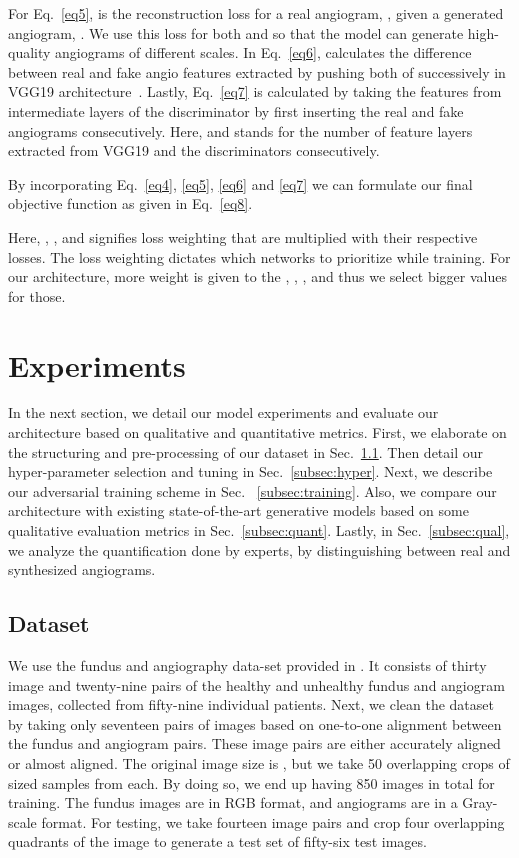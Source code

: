 \documentclass[a4paper,conference]{IEEEtran}
\begin{document}
For Eq.~\ref{eq5},  is the reconstruction loss for a real angiogram, , given a generated angiogram, . We use this loss for both  and  so that the model can generate high-quality angiograms of different scales. In Eq.~\ref{eq6},  calculates the difference between real and fake angio features extracted by pushing both of successively in VGG19 architecture~\cite{simonyan2014very}.  Lastly, Eq.~\ref{eq7} is calculated by taking the features from intermediate layers of the discriminator by first inserting the real and fake angiograms consecutively. Here,  and  stands for the number of feature layers extracted from VGG19 and the discriminators consecutively.

By incorporating Eq.~\ref{eq4}, \ref{eq5}, \ref{eq6} and \ref{eq7} we can formulate our final objective function as given in Eq.~\ref{eq8}.


Here, , ,  and  signifies loss weighting that are multiplied with their respective losses. The loss weighting dictates which networks to prioritize while training. For our architecture, more weight is given to the , , , and thus we select bigger  values for those. 

\section{Experiments}
In the next section, we detail our model experiments and evaluate our architecture based on qualitative and quantitative metrics. First, we elaborate on the structuring and pre-processing of our dataset in Sec.~\ref{subsec:dataset}. Then detail our hyper-parameter selection and tuning in Sec.~\ref{subsec:hyper}. Next, we describe our adversarial training scheme in Sec. ~\ref{subsec:training}. Also, we compare our architecture with existing state-of-the-art generative models based on some qualitative evaluation metrics in Sec.~\ref{subsec:quant}. Lastly, in Sec.~\ref{subsec:qual},  we analyze the quantification done by experts, by distinguishing between real and synthesized angiograms. 
\subsection{Dataset}
\label{subsec:dataset}
We use the fundus and angiography data-set provided in \cite{hajeb2012diabetic}. It consists of thirty image and twenty-nine pairs of the healthy and unhealthy fundus and angiogram images, collected from fifty-nine individual patients. Next, we clean the dataset by taking only seventeen pairs of images based on one-to-one alignment between the fundus and angiogram pairs. These image pairs are either accurately aligned or almost aligned. The original image size is , but we take 50 overlapping crops of   sized samples from each. By doing so, we end up having  850 images in total for training. The fundus images are in RGB format, and angiograms are in a Gray-scale format. For testing, we take fourteen image pairs and crop four overlapping quadrants of the image to generate a test set of fifty-six test images.
\end{document}
